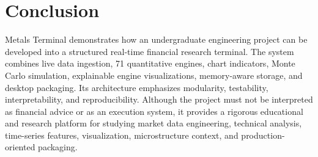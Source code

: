 \documentclass[conference]{IEEEtran}
\begin{document}
\section{Conclusion}

Metals Terminal demonstrates how an undergraduate engineering project can be
developed into a structured real-time financial research terminal. The system
combines live data ingestion, 71 quantitative engines, chart indicators,
Monte Carlo simulation, explainable engine visualizations, memory-aware
storage, and desktop packaging. Its architecture emphasizes modularity,
testability, interpretability, and reproducibility. Although the project must
not be interpreted as financial advice or as an execution system, it provides
a rigorous educational and research platform for studying market data
engineering, technical analysis, time-series features, visualization,
microstructure context, and production-oriented packaging.
\end{document}
